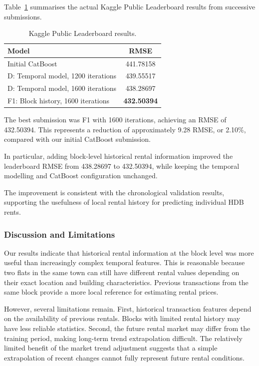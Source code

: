 \documentclass[11pt,a4paper]{article}
\begin{document}
Table~\ref{tab:kaggle_results} summarises the actual Kaggle Public Leaderboard results from successive submissions.

\begin{table}[t]
\centering
\caption{Kaggle Public Leaderboard results.}
\label{tab:kaggle_results}
\small
\begin{tabular}{lc}
\hline
Model & RMSE \\
\hline
Initial CatBoost & 441.78158 \\
D: Temporal model, 1200 iterations & 439.55517 \\
D: Temporal model, 1600 iterations & 438.28697 \\
F1: Block history, 1600 iterations & \textbf{432.50394} \\
\hline
\end{tabular}
\end{table}

The best submission was F1 with 1600 iterations, achieving an RMSE of 432.50394. This represents a reduction of approximately 9.28 RMSE, or 2.10\%, compared with our initial CatBoost submission.

In particular, adding block-level historical rental information improved the leaderboard RMSE from 438.28697 to 432.50394, while keeping the temporal modelling and CatBoost configuration unchanged.

The improvement is consistent with the chronological validation results, supporting the usefulness of local rental history for predicting individual HDB rents.


\subsubsection{Discussion and Limitations}

Our results indicate that historical rental information at the block level was more useful than increasingly complex temporal features. This is reasonable because two flats in the same town can still have different rental values depending on their exact location and building characteristics. Previous transactions from the same block provide a more local reference for estimating rental prices.

However, several limitations remain. First, historical transaction features depend on the availability of previous rentals. Blocks with limited rental history may have less reliable statistics. Second, the future rental market may differ from the training period, making long-term trend extrapolation difficult. The relatively limited benefit of the market trend adjustment suggests that a simple extrapolation of recent changes cannot fully represent future rental conditions.
\end{document}
